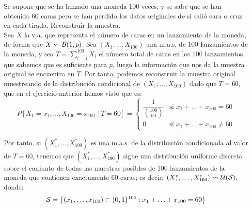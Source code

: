 \begin{ejemplo}
    Se supone que se ha lanzado una moneda 100 veces, y se sabe que se han obtenido 60 caras pero se han perdido los datos originales de si salió cara o cruz en cada tirada. Reconstruir la muestra.\\

    Sea $X$ la v.a. que representa el número de caras en un lanzamiento de la moneda, de forma que $X\rightsquigarrow \mathcal{B}(1,p)$. Sea $(X_1, \ldots, X_{100})$ una m.a.s. de 100 lanzamientos de la moneda, y sea $T = \sum\limits_{i=1}^{100} X_i$ el número total de caras en los 100 lanzamientos, que sabemos que es suficiente para $p$, luego la información que nos da la muestra original se encuentra en $T$. Por tanto, podemos reconstruir la muestra original muestreando de la distribución condicional de $(X_1, \ldots, X_{100})$ dado que $T=60$, que en el ejercicio anterior hemos visto que es:
    \begin{equation*}
        P[X_1=x_1, \ldots, X_{100}=x_{100} \mid T=60] = \begin{cases}
            \dfrac{1}{\binom{100}{60}} & \text{si } x_1+\ldots+x_{100}=60 \\
            0 & \text{si } x_1+\ldots+x_{100}\neq 60
        \end{cases}
    \end{equation*}

    Por tanto, si $(X_1^*, \ldots, X_{100}^*)$ es una m.a.s. de la distribución condicionada al valor de $T=60$, tenemos que $(X_1^*, \ldots, X_{100}^*)$ sigue una distribución uniforme discreta sobre el conjunto de todas las muestras posibles de 100 lanzamientos de la moneda que contienen exactamente 60 caras; es decir, $(X_1^*, \ldots, X_{100}^*)\rightsquigarrow \mathcal{U}(\mathcal{S})$, donde:
    \begin{equation*}
        \mathcal{S} = \left\{(x_1, \ldots, x_{100})\in\{0,1\}^{100} : x_1+\ldots+x_{100}=60\right\}
    \end{equation*}
\end{ejemplo}


